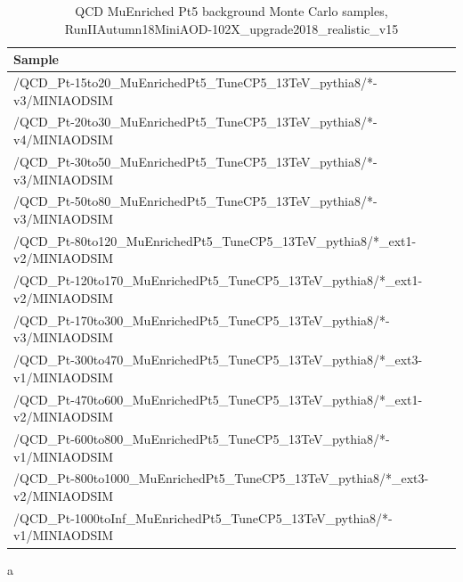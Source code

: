 \begin{table}[htb]
  \caption{QCD MuEnriched Pt5 background Monte Carlo samples, RunIIAutumn18MiniAOD-102X\_upgrade2018\_realistic\_v15}
  \begin{center}
    \footnotesize
    \begin{tabular}{l}\hline
      Sample \\
      \hline
      /QCD\_Pt-15to20\_MuEnrichedPt5\_TuneCP5\_13TeV\_pythia8/*-v3/MINIAODSIM \\
      /QCD\_Pt-20to30\_MuEnrichedPt5\_TuneCP5\_13TeV\_pythia8/*-v4/MINIAODSIM \\
      /QCD\_Pt-30to50\_MuEnrichedPt5\_TuneCP5\_13TeV\_pythia8/*-v3/MINIAODSIM \\
      /QCD\_Pt-50to80\_MuEnrichedPt5\_TuneCP5\_13TeV\_pythia8/*-v3/MINIAODSIM \\
      /QCD\_Pt-80to120\_MuEnrichedPt5\_TuneCP5\_13TeV\_pythia8/*\_ext1-v2/MINIAODSIM \\
      /QCD\_Pt-120to170\_MuEnrichedPt5\_TuneCP5\_13TeV\_pythia8/*\_ext1-v2/MINIAODSIM \\
      /QCD\_Pt-170to300\_MuEnrichedPt5\_TuneCP5\_13TeV\_pythia8/*-v3/MINIAODSIM \\
      /QCD\_Pt-300to470\_MuEnrichedPt5\_TuneCP5\_13TeV\_pythia8/*\_ext3-v1/MINIAODSIM \\
      /QCD\_Pt-470to600\_MuEnrichedPt5\_TuneCP5\_13TeV\_pythia8/*\_ext1-v2/MINIAODSIM \\
      /QCD\_Pt-600to800\_MuEnrichedPt5\_TuneCP5\_13TeV\_pythia8/*-v1/MINIAODSIM \\
      /QCD\_Pt-800to1000\_MuEnrichedPt5\_TuneCP5\_13TeV\_pythia8/*\_ext3-v2/MINIAODSIM \\
      /QCD\_Pt-1000toInf\_MuEnrichedPt5\_TuneCP5\_13TeV\_pythia8/*-v1/MINIAODSIM \\
      \hline
    \end{tabular}
    \label{tab:QCDsample}
  \end{center}
\end{table}
a



